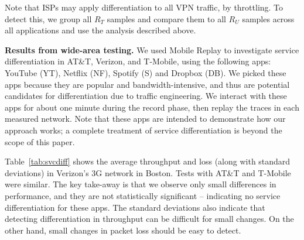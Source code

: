 Note that ISPs may apply differentiation to all VPN traffic, \eg by throttling. To detect this, we group all $R_T$ 
samples and compare them to all $R_U$ samples across all applications and use the analysis described above. 


\noindent\textbf{Results from wide-area testing.} We used Mobile Replay to investigate service differentiation in 
AT\&T, Verizon, and T-Mobile, using the following apps: YouTube (YT), Netflix (NF), Spotify (S) and Dropbox (DB). 
We picked these apps because they are popular and bandwidth-intensive, and thus are potential candidates 
for differentiation due to traffic engineering. We interact with these apps for about one minute during the record 
phase, then replay the traces in each measured network. Note that these apps are intended to demonstrate 
how our approach works; a complete treatment of service differentiation is beyond the scope of this paper. 

Table~\ref{tab:svcdiff} shows the average throughput and loss (along with standard deviations) in Verizon's 3G network 
in Boston. Tests with AT\&T and T-Mobile were similar. The key take-away is that we observe only small 
differences in performance, and they are not statistically significant -- indicating no service differentiation for 
these apps. The standard deviations also indicate that detecting differentiation in throughput can be difficult 
for small changes. On the other hand, small changes in packet loss should be easy to detect.    
 

